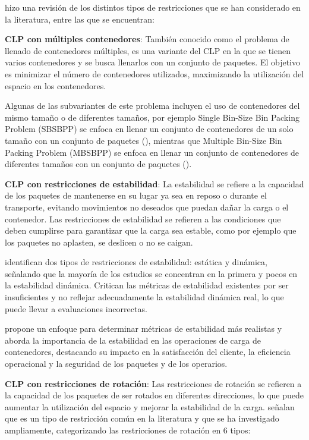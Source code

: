 \textcite{Bortfeldt20131} hizo una revisión de los distintos tipos de restricciones que se han considerado en la literatura, entre las que se encuentran:

\textbf{CLP con múltiples contenedores}: También conocido como el problema de llenado de contenedores múltiples, es una variante del CLP en la que se tienen varios contenedores y se busca llenarlos con un conjunto de paquetes. El objetivo es minimizar el número de contenedores utilizados, maximizando la utilización del espacio en los contenedores.

Algunas de las subvariantes de este problema incluyen el uso de contenedores del mismo tamaño o de diferentes tamaños, por ejemplo Single Bin-Size Bin Packing Problem (SBSBPP) se enfoca en llenar un conjunto de contenedores de un solo tamaño con un conjunto de paquetes (\textcite{ren2011priority}), mientras que Multiple Bin-Size Bin Packing Problem (MBSBPP) se enfoca en llenar un conjunto de contenedores de diferentes tamaños con un conjunto de paquetes (\textcite{zhao2016comparative}).

\textbf{CLP con restricciones de estabilidad}: La estabilidad se refiere a la capacidad de los paquetes de mantenerse en su lugar ya sea en reposo o durante el transporte, evitando movimientos no deseados que puedan dañar la carga o el contenedor. Las restricciones de estabilidad se refieren a las condiciones que deben cumplirse para garantizar que la carga sea estable, como por ejemplo que los paquetes no aplasten, se deslicen o no se caigan.

\textcite{Bortfeldt20131} identifican dos tipos de restricciones de estabilidad: estática y dinámica, señalando que la mayoría de los estudios se concentran en la primera y pocos en la estabilidad dinámica. Critican las métricas de estabilidad existentes por ser insuficientes y no reflejar adecuadamente la estabilidad dinámica real, lo que puede llevar a evaluaciones incorrectas.

\textcite{RAMOS2015480} propone un enfoque para determinar métricas de estabilidad más realistas y aborda la importancia de la estabilidad en las operaciones de carga de contenedores, destacando su impacto en la satisfacción del cliente, la eficiencia operacional y la seguridad de los paquetes y de los operarios.


\textbf{CLP con restricciones de rotación}: Las restricciones de rotación se refieren a la capacidad de los paquetes de ser rotados en diferentes direcciones, lo que puede aumentar la utilización del espacio y mejorar la estabilidad de la carga. \textcite{Bortfeldt20131} señalan que es un tipo de restricción común en la literatura y que se ha investigado ampliamente, categorizando las restricciones de rotación en 6 tipos:

